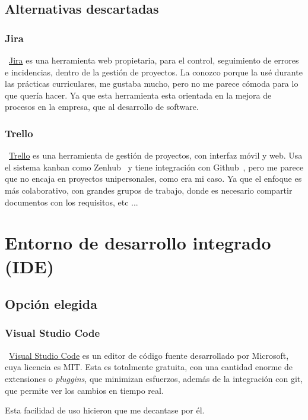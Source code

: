 \subsection{Alternativas descartadas}

\subsubsection{Jira}
~\href{https://www.atlassian.com/es/software/jira}{Jira} es una herramienta web propietaria, para el control, seguimiento de errores e incidencias, dentro de la gestión de proyectos. La conozco porque la usé durante las prácticas curriculares, me gustaba mucho, pero no me parece cómoda para lo que quería hacer. Ya que esta herramienta esta orientada en la mejora de procesos en la empresa, que al desarrollo de software.

\subsubsection{Trello}
~\href{https://trello.com/es}{Trello} es una herramienta de gestión de proyectos, con interfaz móvil y web. Usa el sistema kanban como Zenhub~\pageref{zenhub} y tiene integración con Github~\pageref{github}, pero me parece que no encaja en proyectos unipersonales, como era mi caso. Ya que el enfoque es más colaborativo, con grandes grupos de trabajo, donde es necesario compartir documentos con los requisitos, etc ...

\section{Entorno de desarrollo integrado (IDE)}

\subsection{Opción elegida}

\subsubsection{Visual Studio Code}
~\href{https://code.visualstudio.com/}{Visual Studio Code} es un editor de código fuente desarrollado por Microsoft, cuya licencia es MIT. Esta es totalmente gratuita, con una cantidad enorme de extensiones o \emph{pluggins}, que minimizan esfuerzos, además de la integración con git, que permite ver los cambios en tiempo real. 

Esta facilidad de uso hicieron que me decantase por él.

